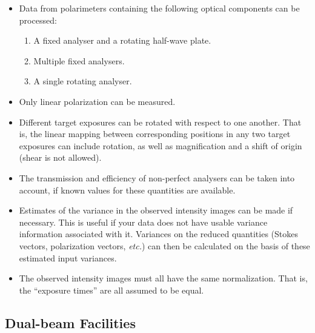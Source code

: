 \documentclass[twoside,11pt]{article}
\renewcommand{\_}{\texttt{\symbol{95}}}
\begin{document}
\begin{itemize}

\item Data from polarimeters containing the following optical components 
can be processed:

\begin{enumerate}
\item A fixed analyser and a rotating half-wave plate.
\item Multiple fixed analysers.
\item A single rotating analyser.
\end{enumerate}

\item Only linear polarization can be measured. 

\item Different target exposures can be rotated with respect to one
another. That is, the linear mapping between corresponding positions in 
any two target 
exposures can include rotation, as well as magnification and a shift of 
origin (shear is not allowed).

\item The transmission and efficiency of non-perfect analysers can be
taken into account, if known values for these quantities are available.

\item Estimates of the variance in the observed intensity images can be made 
if necessary. This is useful if your data does not have usable variance
information associated with it. Variances on the reduced quantities
(Stokes vectors, polarization vectors, \emph{etc.}) can then be calculated 
on the basis of these estimated input variances.

\item The observed intensity images must all have the same normalization.
That is, the ``exposure times'' are all assumed to be equal.

\end{itemize}

\subsection{Dual-beam Facilities}
\end{document}
